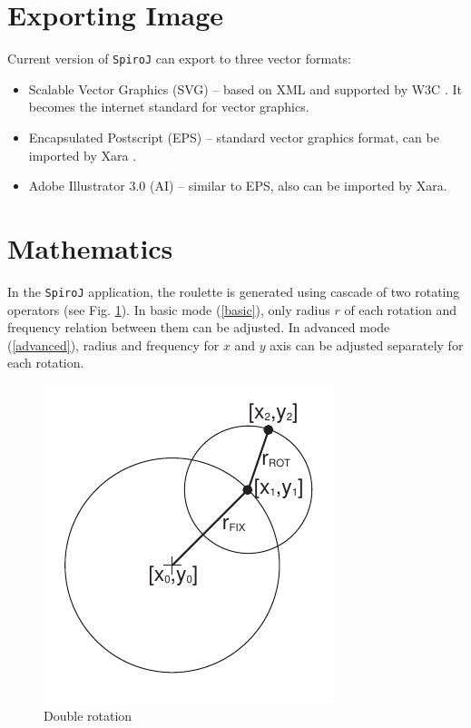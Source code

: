 \documentclass[12pt, a4paper]{article}
\newcommand{\appName}{\texttt{SpiroJ}}
\begin{document}
\section{Exporting Image}

Current version of \appName{} can export to three vector formats:
\begin{itemize}
  \item Scalable Vector Graphics (SVG) -- based on XML and supported by W3C \cite{svg}. It becomes the internet standard for vector graphics.
  \item Encapsulated Postscript (EPS) -- standard vector graphics format, can be imported by Xara \cite{xara}.
  \item Adobe Illustrator 3.0 (AI) -- similar to EPS, also can be imported by Xara.
\end{itemize}

\section{Mathematics}\label{sec.mathem}

In the \appName{} application, the roulette is generated using cascade of two rotating operators (see Fig. \ref{doubleRot}). In basic mode (\ref{basic}), only radius $r$ of each rotation and frequency relation between them can be adjusted. In advanced mode (\ref{advanced}), radius and frequency for $x$ and $y$ axis can be adjusted separately for each rotation.

\begin{figure}[htp]\centering
  \includegraphics{math}
  \caption{Double rotation}
  \label{doubleRot}
\end{figure}
\end{document}
